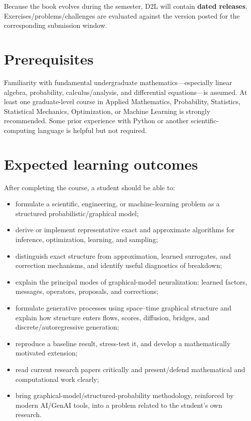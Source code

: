 \documentclass[11pt]{article}
\begin{document}
Because the book evolves during the semester, D2L will contain \textbf{dated releases}. Exercises/problems/challenges are evaluated against the version posted for the corresponding submission window.

\section*{Prerequisites}

Familiarity with fundamental undergraduate mathematics---especially linear algebra, probability, calculus/analysis, and differential equations---is assumed. At least one graduate-level course in Applied Mathematics, Probability, Statistics, Statistical Mechanics, Optimization, or Machine Learning is strongly recommended. Some prior experience with Python or another scientific-computing language is helpful but not required.

\section*{Expected learning outcomes}

After completing the course, a student should be able to:
\begin{itemize}
\item formulate a scientific, engineering, or machine-learning problem as a structured probabilistic/graphical model;
\item derive or implement representative exact and approximate algorithms for inference, optimization, learning, and sampling;
\item distinguish exact structure from approximation, learned surrogates, and correction mechanisms, and identify useful diagnostics of breakdown;
\item explain the principal modes of graphical-model neuralization: learned factors, messages, operators, proposals, and corrections;
\item formulate generative processes using space--time graphical structure and explain how structure enters flows, scores, diffusion, bridges, and discrete/autoregressive generation;
\item reproduce a baseline result, stress-test it, and develop a mathematically motivated extension;
\item read current research papers critically and present/defend mathematical and computational work clearly;
\item bring graphical-model/structured-probability methodology, reinforced by modern AI/GenAI tools, into a problem related to the student's own research.
\end{itemize}
\end{document}
